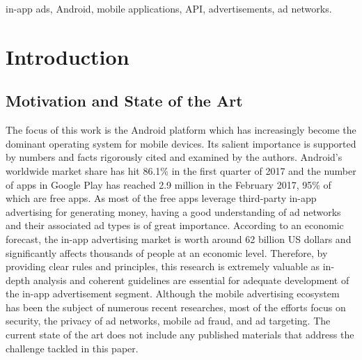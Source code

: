 \documentclass[conference]{IEEEtran}
\begin{document}
\begin{IEEEkeywords}
in-app ads, Android, mobile applications, API, advertisements, ad networks.
\end{IEEEkeywords}

\section{Introduction}
\subsection{Motivation and State of the Art}
The focus of this work is the Android platform which has increasingly become the dominant operating system for mobile devices. Its salient importance is supported by numbers and facts rigorously cited and examined by the authors. Android’s worldwide market share has hit 86.1\% in the first quarter of 2017 and the number of apps in Google Play has reached 2.9 million in the February 2017, 95\% of which are free apps\cite{Gartner}. As most of the free apps leverage third-party in-app advertising for generating money, having a good understanding of ad networks and their associated ad types is of great importance. According to an economic forecast\cite{Visionmobile}, the in-app advertising market is worth around 62 billion US dollars and significantly affects thousands of people at an economic level. Therefore, by providing clear rules and principles, this research is extremely valuable as in-depth analysis and coherent guidelines are essential for adequate development of the in-app advertisement segment. Although the mobile advertising ecosystem has been the subject of numerous recent researches, most of the efforts focus on security, the privacy of ad networks, mobile ad fraud, and ad targeting. The current state of the art does not include any published materials that address the challenge tackled in this paper.
\end{document}
